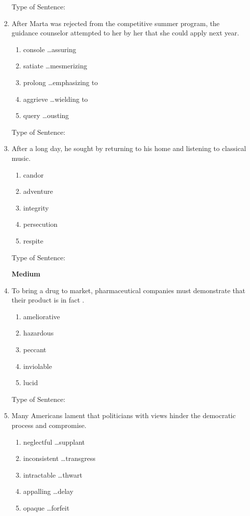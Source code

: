 \begin{enumerate}
Type of Sentence:\hrulefill

\bigskip
\item After Marta was rejected from the competitive summer program, the guidance counselor attempted to \longline her by \longline her that she could apply next year. 
\begin{enumerate}[label=(\Alph*)]
\item console \ldots assuring
\item satiate \ldots mesmerizing
\item prolong \ldots emphasizing to
\item aggrieve \ldots wielding to 
\item query \ldots ousting 
\end{enumerate}

Type of Sentence:\hrulefill

\bigskip
\item After a long day, he sought \longline by returning to his home and listening to classical music. 
\begin{enumerate}[label=(\Alph*)]
\item candor
\item adventure
\item integrity
\item persecution
\item respite
\end{enumerate}

Type of Sentence:\hrulefill

\textbf{Medium}

\bigskip
\item To bring a drug to market, pharmaceutical companies must demonstrate that their product is in fact \longline.
\begin{enumerate}[label=(\Alph*)]
\item ameliorative
\item hazardous
\item peccant
\item inviolable 
\item lucid
\end{enumerate}

Type of Sentence:\hrulefill

\bigskip
\item Many Americans lament that politicians with \longline views hinder the democratic process and \longline compromise.
\begin{enumerate}[label=(\Alph*)]
\item neglectful \ldots supplant
\item inconsistent \ldots transgress 
\item intractable \ldots thwart
\item appalling \ldots delay
\item opaque \ldots forfeit
\end{enumerate}


\end{enumerate}
